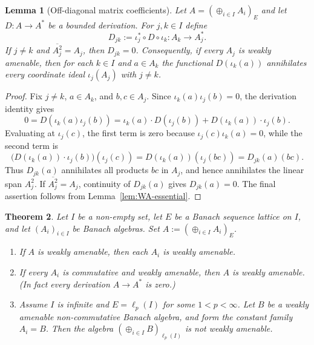 \documentclass[reqno]{amsart}
\theoremstyle{plain}
\newtheorem{theorem}{Theorem}[section]
\newtheorem{lemma}[theorem]{Lemma}
\theoremstyle{definition}
\theoremstyle{remark}
\begin{document}
\begin{lemma}[Off-diagonal matrix coefficients]\label{lem:off-diagonal}
Let $A=(\oplus_{i\in I}A_i)_E$ and let $D\colon A\to A^*$ be a bounded derivation.
For $j,k\in I$ define
\[
D_{jk}:=\iota_j^*\circ D\circ\iota_k\colon A_k\longrightarrow A_j^*.
\]
If $j\neq k$ and $\overline{A_j^2}=A_j$, then $D_{jk}=0$.  Consequently, if every $A_j$ is
weakly amenable, then for each $k\in I$ and $a\in A_k$ the functional
$D(\iota_k(a))$ annihilates every coordinate ideal $\iota_j(A_j)$ with $j\neq k$.
\end{lemma}

\begin{proof}
Fix $j\neq k$, $a\in A_k$, and $b,c\in A_j$.  Since
$\iota_k(a)\iota_j(b)=0$, the derivation identity gives
\[
0=D(\iota_k(a)\iota_j(b))
  =\iota_k(a)\cdot D(\iota_j(b))+D(\iota_k(a))\cdot \iota_j(b).
\]
Evaluating at $\iota_j(c)$, the first term is zero because
$\iota_j(c)\iota_k(a)=0$, while the second term is
\[
\bigl(D(\iota_k(a))\cdot\iota_j(b)\bigr)(\iota_j(c))
   =D(\iota_k(a))(\iota_j(bc))=D_{jk}(a)(bc).
\]
Thus $D_{jk}(a)$ annihilates all products $bc$ in $A_j$, and hence annihilates the
linear span $A_j^2$.  If $\overline{A_j^2}=A_j$, continuity of $D_{jk}(a)$ gives
$D_{jk}(a)=0$.  The final assertion follows from Lemma~\ref{lem:WA-essential}.
\end{proof}

\begin{theorem}\label{thm:WA-counterpart}
Let $I$ be a non-empty set, let $E$ be a Banach sequence lattice on $I$, and let $(A_i)_{i\in I}$ be Banach algebras.
Set $A:=(\oplus_{i\in I}A_i)_E$.

\begin{enumerate}[label={\rm(\arabic*)},leftmargin=3.2em]
\item If $A$ is weakly amenable, then each $A_i$ is weakly amenable.
\item If every $A_i$ is commutative and weakly amenable, then $A$ is weakly amenable.
(In fact every derivation $A\to A^*$ is zero.)
\item Assume $I$ is infinite and $E=\ell_p(I)$ for some $1<p<\infty$.
Let $B$ be a weakly amenable \emph{non-commutative} Banach algebra, and form the constant family $A_i=B$.
Then the algebra $(\oplus_{i\in I}B)_{\ell_p(I)}$ is \emph{not} weakly amenable.
\end{enumerate}
\end{theorem}
\end{document}
